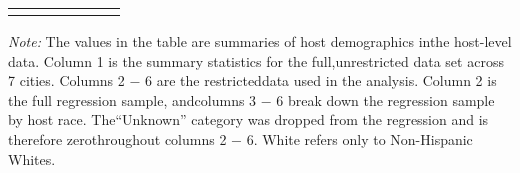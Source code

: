 \begin{table}[htbp]
\begin{center}
\begin{tabular}{l c | c | c c c c}
\\
\hline\hline\noalign{\smallskip} \end{tabular} 
\begin{minipage}{6in}
{\it Note:} The values in the table are summaries of host demographics inthe host-level data. Column 1 is the summary statistics for the full,unrestricted data set across 7 cities. Columns 2 $-$ 6 are the restricteddata used in the analysis. Column 2 is the full regression sample, andcolumns 3 $-$ 6 break down the regression sample by host race. The“Unknown” category was dropped from the regression and is therefore zerothroughout columns 2 $-$ 6. White refers only to Non-Hispanic Whites.\end{minipage}
\end{center}
\end{table}
